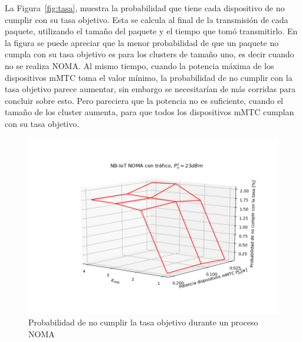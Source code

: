La Figura~\ref{fig:tasa}, muestra la probabilidad que tiene cada dispositivo de no cumplir con su tasa objetivo. Esta se calcula al final de la transmisión de cada paquete, utilizando el tamaño del paquete y el tiempo que tomó transmitirlo. En la figura se puede apreciar que la menor probabilidad de que un paquete no cumpla con su tasa objetivo es para los clusters de tamaño uno, es decir cuando no se realiza NOMA. Al mismo tiempo, cuando la potencia máxima de los dispositivos mMTC toma el valor mínimo, la probabilidad de no cumplir con la tasa objetivo parece aumentar, sin embargo se necesitarían de más corridas para concluir sobre esto. Pero pareciera que la potencia no es suficiente, cuando el tamaño de los cluster aumenta, para que todos los dispositivos mMTC cumplan con su tasa objetivo. \newline

\break

\begin{figure}[th]
    \centering
    \includegraphics[scale=0.8]{Figures/ResultadosTrafico/Figure_3.png}
    \decoRule
    \caption[Probabilidad de no cumplir la tasa objetivo entre procesos NOMA]{Probabilidad de no cumplir la tasa objetivo durante un proceso NOMA}
    \label{fig:tasaNOMA}
\end{figure}

